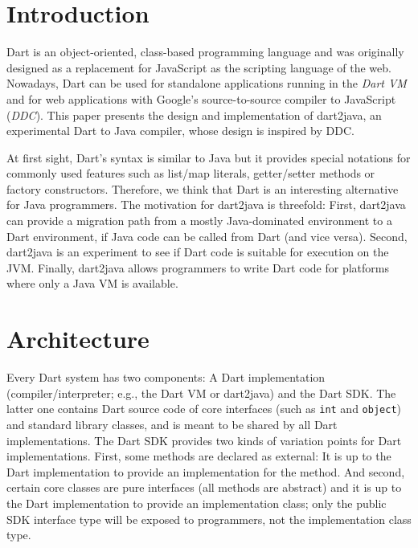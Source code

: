 \documentclass[sigplan,9pt]{acmart}
\begin{document}

\maketitle

\section{Introduction}
Dart is an object-oriented, class-based programming language and was originally designed as a replacement for JavaScript as the scripting language of the web. Nowadays, Dart can be used for standalone applications running in the \emph{Dart VM} and for web applications with Google's source-to-source compiler to JavaScript (\emph{DDC}). This paper presents the design and implementation of dart2java, an experimental Dart to Java compiler, whose design is inspired by DDC.

At first sight, Dart's syntax is similar to Java but it provides special notations for commonly used features such as list/map literals, getter/setter methods or factory constructors. Therefore, we think that Dart is an interesting alternative for Java programmers. The motivation for dart2java is threefold: First, dart2java can provide a migration path from a mostly Java-dominated environment to a Dart environment, if Java code can be called from Dart (and vice versa). Second, dart2java is an experiment to see if Dart code is suitable for execution on the JVM. Finally, dart2java allows programmers to write Dart code for platforms where only a Java VM is available. %
 
\section{Architecture}
Every Dart system has two components: A Dart implementation (compiler/interpreter; e.g., the Dart VM or dart2java) and the Dart SDK. The latter one contains Dart source code of core interfaces (such as \texttt{int} and \texttt{object}) and standard library classes, and is meant to be shared by all Dart implementations. The Dart SDK provides two kinds of variation points for Dart implementations. First, some methods are declared as external: It is up to the Dart implementation to provide an implementation for the method. And second, certain core classes are pure interfaces (all methods are abstract) and it is up to the Dart implementation to provide an implementation class; only the public SDK interface type will be exposed to programmers, not the implementation class type.
\end{document}
